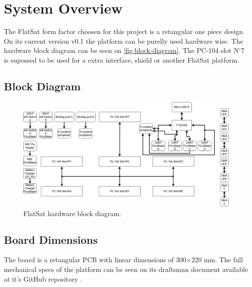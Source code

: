 %
%
%
%
%

%
%
%
%
%
%

\chapter{System Overview} \label{ch:system-overview}

The FlatSat form factor choosen for this project is a retangular one piece design. On its current version v0.1 the platform can be purelly used hardware wise. The hardware block diagram can be seen on \autoref{fig:block-diagram}. The PC-104 slot N$^{\circ}$7 is supossed to be used for a extra interface, shield or another FlatSat platform.

\section{Block Diagram}

\begin{figure}[!ht]
    \begin{center}
        \includegraphics[width=\textwidth]{figures/flatsat_block_diagram.png}
        \caption{FlatSat hardware block diagram.}
        \label{fig:block-diagram}
    \end{center}
\end{figure}

\section{Board Dimensions}

The board is a retangular PCB with linear dimensions of 300$\times$220 mm. The full mechanical specs of the platform can be seen on its draftsman document available at it's GitHub repository \cite{flatsat-draftsman}.

